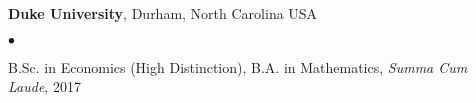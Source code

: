 \documentclass[margin,line]{res}
\newenvironment{listtab}{
\begin{list}{$\bullet$}{%
    \setlength{\itemsep}{0in}
    \setlength{\parsep}{0in} \setlength{\parskip}{0in}
    \setlength{\topsep}{0in} \setlength{\partopsep}{0in}
    \setlength{\leftmargin}{0.075in}}}{\end{list}}
\begin{document}
\begin{resume}
\textbf{Duke University}, Durham, North Carolina USA\\
\vspace*{-.1in}
\begin{listtab}
    \item[] B.Sc. in Economics (High Distinction), B.A. in Mathematics, \emph{Summa Cum Laude}, 2017
\end{listtab}





\end{resume}
\end{document}

